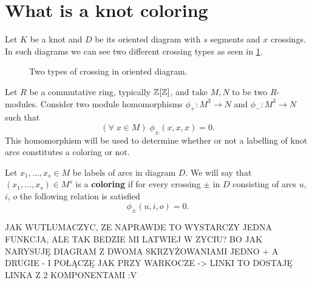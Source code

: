 \section{What is a knot coloring}

Let $K$ be a knot and $D$ be its oriented diagram with $s$ segments and $x$ crossings. In such diagrams we can see two different crossing types as seen in \cref{crossing_type}.
\begin{figure}[h]\centering
  \caption{Two types of crossing in oriented diagram.\label{crossing_type}}
\end{figure}

Let $R$ be a commutative ring, typically $\operatorname{\mathbb{Z}}[\operatorname{\mathbb{Z}}]$, and take $M,N$ to be two $R$-modules. Consider two module homomorphisms $\phi_+:M^3\to N$ and $\phi_-:M^3\to N$ such that
$$(\forall\;x\in M)\;\phi_\pm(x,x,x)=0.$$ 
This homomorphism will be used to determine whether or not a labelling of knot arcs constitutes a coloring or not.

\medskip

\begin{definition}
  Let $x_1,..., x_s\in M$ be labels of arcs in diagram $D$. We will say that $(x_1,...,x_s)\in M^s$ is a \textbf{coloring} if for every crossing $\pm$ in $D$ consisting of arcs $u$, $i$, $o$ the following relation is satisfied
  $$\phi_\pm(u,i,o)=0.$$
\end{definition}

{\large\color{red}JAK WUTLUMACZYC, ZE NAPRAWDE TO WYSTARCZY JEDNA FUNKCJA, ALE TAK BEDZIE MI LATWIEJ W ZYCIU? BO JAK NARYSUJĘ DIAGRAM Z DWOMA SKRZYŻOWANIAMI JEDNO + A DRUGIE - I POŁĄCZĘ JAK PRZY WARKOCZE -> LINKI TO DOSTAJĘ LINKA Z 2 KOMPONENTAMI :V}
%
%
%

